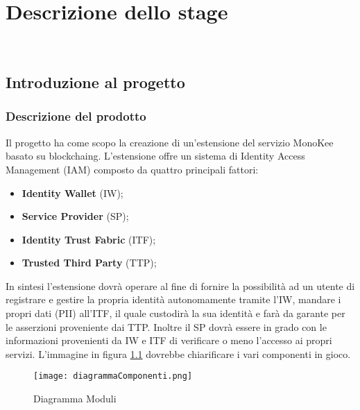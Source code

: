 
\chapter{Descrizione dello stage}
\label{cap:descrizione-stage}

\\

\section{Introduzione al progetto}
\subsection{Descrizione del prodotto}
Il progetto ha come scopo la creazione di un’estensione del servizio MonoKee basato su \gls{blockchaing}. L’estensione offre un sistema di Identity Access Management (IAM) composto da quattro principali fattori:
    \begin{itemize}
        \item \textbf{Identity Wallet} (IW);
        \item \textbf{Service Provider} (SP);
        \item \textbf{Identity Trust Fabric} (ITF);
        \item \textbf{Trusted Third Party} (TTP);
    \end{itemize} 
In sintesi l’estensione dovrà operare al fine di fornire la possibilità ad un utente di registrare e gestire la propria identità autonomamente tramite l’IW, mandare i propri dati (PII) all’ITF, il quale custodirà la sua identità e farà da garante per le asserzioni proveniente dai TTP. Inoltre il SP dovrà essere in grado con le informazioni provenienti da IW e ITF di verificare o meno l’accesso ai propri servizi.
L'immagine in figura \ref{fig:diag-mod} dovrebbe chiarificare i vari componenti in gioco.
\begin{figure}[!h]
    \centering
    \texttt{[image: diagrammaComponenti.png]} 
    \caption{Diagramma Moduli}
    \label{fig:diag-mod} 
\end{figure}
